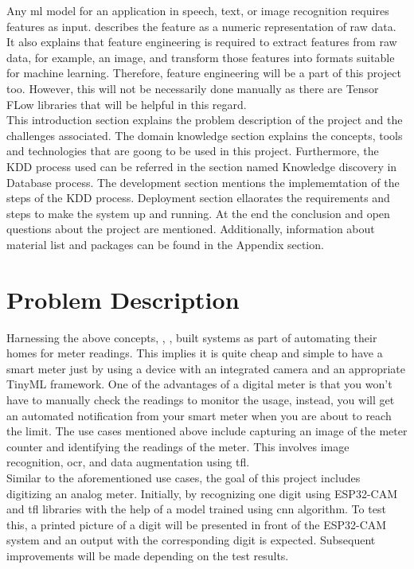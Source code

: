 Any \ac{ml} model for an application in speech, text, or image recognition requires features as input. \autocite{Zheng:2018} describes the feature as a numeric representation of raw data. It also explains that feature engineering is required to extract features from raw data, for example, an image, and transform those features into formats suitable for machine learning. Therefore, feature engineering will be a part of this project too. However, this will not be necessarily done manually as there are Tensor FLow libraries that will be helpful in this regard.\\

This introduction section explains the problem description of the project and the challenges associated. The domain knowledge section explains the concepts, tools and technologies that are goong to be used in this project. Furthermore, the KDD process used can be referred in the section named Knowledge discovery in Database process. The development section mentions the implememtation of the steps of the KDD process. Deployment section ellaorates the requirements and steps to make the system up and running. At the end the conclusion and open questions about the project are mentioned. Additionally, information about material list and packages can be found in the Appendix section.

\section{Problem Description}

Harnessing the above concepts, \autocite{Sparber:2020}, \autocite{JHTECH:2017}, \autocite{List:2021} built systems as part of automating their homes for meter readings. This implies it is quite cheap and simple to have a smart meter just by using a device with an integrated camera and an appropriate TinyML framework. One of the advantages of a digital meter is that you won't have to manually check the readings to monitor the usage, instead, you will get an automated notification from your smart meter when you are about to reach the limit. The use cases mentioned above include capturing an image of the meter counter and identifying the readings of the meter. This involves image recognition, \ac{ocr}, and data augmentation using \ac{tfl}.\\

Similar to the aforementioned use cases, the goal of this project includes digitizing an analog meter. Initially, by recognizing one digit using ESP32-CAM and \ac{tfl} libraries with the help of a model trained using \ac{cnn} algorithm. To test this, a printed picture of a digit will be presented in front of the ESP32-CAM system and an output with the corresponding digit is expected. Subsequent improvements will be made depending on the test results.

